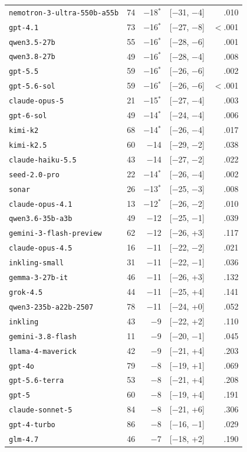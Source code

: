 {\begin{tabular}[t]{lrrrr}
\texttt{nemotron-3-ultra-550b-a55b} & 74 & $-$18$^*$ & [$-$31, $-$4] & .010 \\
\texttt{gpt-4.1} & 73 & $-$16$^*$ & [$-$27, $-$8] & $<$.001 \\
\texttt{qwen3.5-27b} & 55 & $-$16$^*$ & [$-$28, $-$6] & .001 \\
\texttt{qwen3.8-27b} & 49 & $-$16$^*$ & [$-$28, $-$4] & .008 \\
\texttt{gpt-5.5} & 59 & $-$16$^*$ & [$-$26, $-$6] & .002 \\
\texttt{gpt-5.6-sol} & 59 & $-$16$^*$ & [$-$26, $-$6] & $<$.001 \\
\texttt{claude-opus-5} & 21 & $-$15$^*$ & [$-$27, $-$4] & .003 \\
\texttt{gpt-6-sol} & 49 & $-$14$^*$ & [$-$24, $-$4] & .006 \\
\texttt{kimi-k2} & 68 & $-$14$^*$ & [$-$26, $-$4] & .017 \\
\texttt{kimi-k2.5} & 60 & $-$14 & [$-$29, $-$2] & .038 \\
\texttt{claude-haiku-5.5} & 43 & $-$14 & [$-$27, $-$2] & .022 \\
\texttt{seed-2.0-pro} & 22 & $-$14$^*$ & [$-$26, $-$4] & .002 \\
\texttt{sonar} & 26 & $-$13$^*$ & [$-$25, $-$3] & .008 \\
\texttt{claude-opus-4.1} & 13 & $-$12$^*$ & [$-$26, $-$2] & .010 \\
\texttt{qwen3.6-35b-a3b} & 49 & $-$12 & [$-$25, $-$1] & .039 \\
\texttt{gemini-3-flash-preview} & 62 & $-$12 & [$-$26, +3] & .117 \\
\texttt{claude-opus-4.5} & 16 & $-$11 & [$-$22, $-$2] & .021 \\
\texttt{inkling-small} & 31 & $-$11 & [$-$22, $-$1] & .036 \\
\texttt{gemma-3-27b-it} & 46 & $-$11 & [$-$26, +3] & .132 \\
\texttt{grok-4.5} & 44 & $-$11 & [$-$25, +4] & .141 \\
\texttt{qwen3-235b-a22b-2507} & 78 & $-$11 & [$-$24, +0] & .052 \\
\texttt{inkling} & 43 & $-$9 & [$-$22, +2] & .110 \\
\texttt{gemini-3.8-flash} & 11 & $-$9 & [$-$20, $-$1] & .045 \\
\texttt{llama-4-maverick} & 42 & $-$9 & [$-$21, +4] & .203 \\
\texttt{gpt-4o} & 79 & $-$8 & [$-$19, +1] & .069 \\
\texttt{gpt-5.6-terra} & 53 & $-$8 & [$-$21, +4] & .208 \\
\texttt{gpt-5} & 60 & $-$8 & [$-$19, +4] & .191 \\
\texttt{claude-sonnet-5} & 84 & $-$8 & [$-$21, +6] & .306 \\
\texttt{gpt-4-turbo} & 86 & $-$8 & [$-$16, $-$1] & .029 \\
\texttt{glm-4.7} & 46 & $-$7 & [$-$18, +2] & .190 \\
\bottomrule
\end{tabular}}
